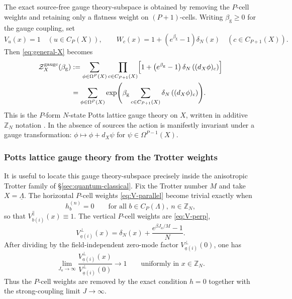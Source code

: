 The exact source-free gauge theory-subspace is obtained by removing the \(P\)-cell
weights and retaining only a flatness weight on \((P+1)\)-cells. Writing
\(\beta_{\mathrm g}\ge 0\) for the gauge coupling, set
\begin{equation}
	V_u(x)=1
	\quad (u\in C_P(X)),
	\qquad
	W_c(x)=1+\left(e^{\beta_{\mathrm g}}-1\right)\delta_N(x)
	\quad (c\in C_{P+1}(X)).
	\label{eq:gauge-weights}
\end{equation}
Then \eqref{eq:general-X} becomes
\begin{align}
	\mathcal Z_X^{\mathrm{gauge}}(\beta_{\mathrm g})
	&:=
	\sum_{\phi\in \Omega^P(X)}
	\prod_{c\in C_{P+1}(X)}
	\Bigl[
	1+\left(e^{\beta_{\mathrm g}}-1\right)\delta_N\left((d_X\phi)_c\right)
	\Bigr]
	\nonumber\\
	&=
	\sum_{\phi\in \Omega^P(X)}
	\exp\Biggl(
	\beta_{\mathrm g}
	\sum_{c\in C_{P+1}(X)}
	\delta_N\left((d_X\phi)_c\right)
	\Biggr).
	\label{eq:gauge-partition}
\end{align}
This is the \(P\)-form \(N\)-state Potts lattice gauge theory on \(X\), written
in additive \(\mathbb Z_N\) notation
\cite{Wegner:1971app,FradkinShenker1979,BanksRabinovici1979,
	HiraokaShirai2016,DuncanSchweinhartTopological,
	DuncanSchweinhartDeconfinement}. In the absence of sources the action is manifestly invariant under a gauge transformation: $\phi \mapsto \phi + d_X\psi$ for $\psi \in \Omega^{P-1}(X)$.


\subsubsection{Potts lattice gauge theory from the Trotter weights}
It is useful to locate this gauge theory-subspace precisely inside the anisotropic
Trotter family of \S\ref{sec:quantum-classical}. Fix the Trotter number \(M\)
and take \(X=\underline\Lambda\). The horizontal \(P\)-cell weights
\eqref{eq:V-parallel} become trivial exactly when
\begin{equation}
	h_b^{(n)}=0
	\qquad
	\text{for all }b\in C_P(\Lambda),\ n\in\mathbb Z_N,
\end{equation}
so that \(V_{b(i)}^{\parallel}(x)\equiv 1\). The vertical \(P\)-cell weights are
\eqref{eq:V-perp},
\begin{equation}
	V_{\underline a(i)}^{\perp}(x)
	=
	\delta_N(x)+\frac{e^{\beta J_a/M}-1}{N}.
\end{equation}
After dividing by the field-independent zero-mode factor
\(V_{\underline a(i)}^{\perp}(0)\), one has
\begin{equation}
	\lim_{J_a\to\infty}
	\frac{V_{\underline a(i)}^{\perp}(x)}{V_{\underline a(i)}^{\perp}(0)}
	\to 1
	\qquad
	\text{uniformly in }x\in\mathbb Z_N.
\end{equation}
Thus the \(P\)-cell weights are removed by the exact condition \(h=0\) together
with the strong-coupling limit \(J\to\infty\).

